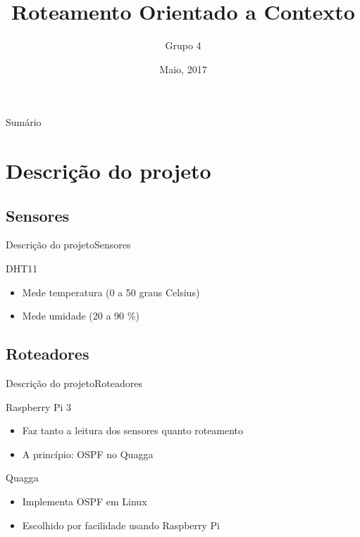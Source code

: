 \documentclass{beamer}
\title{Roteamento Orientado a Contexto}
\subtitle{Grupo 4}
\institute[UnB]
{
    Universidade de Brasília
}
\date{Maio, 2017}
\begin{document}
\begin{frame}
  \titlepage
\end{frame}

\begin{frame}{Sumário}
  \tableofcontents
\end{frame}

\section{Descrição do projeto}

\subsection{Sensores}

\begin{frame}[fragile]{Descrição do projeto}{Sensores}

    \begin{block}{DHT11}    
        \begin{itemize}
            \item Mede temperatura (0 a 50 graus Celsius)
            \item Mede umidade (20 a 90 \%)
        \end{itemize}
    \end{block}
\end{frame}

\subsection{Roteadores}

\begin{frame}[fragile]{Descrição do projeto}{Roteadores}

    \begin{block}{Raspberry Pi 3}    
        \begin{itemize}
            \item Faz tanto a leitura dos sensores quanto roteamento
            \item A princípio: OSPF no Quagga
        \end{itemize}
    \end{block}

    \begin{block}{Quagga}
        \begin{itemize}
            \item Implementa OSPF em Linux
            \item Escolhido por facilidade usando Raspberry Pi
        \end{itemize}
    \end{block}
\end{frame}
\end{document}
